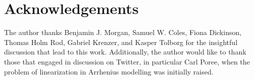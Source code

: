\documentclass[journal=jceda8,manuscript=article]{achemso}
\begin{document}
\section*{Acknowledgements}

The author thanks Benjamin J. Morgan, Samuel W. Coles, Fiona Dickinson, Thomas Holm Rod, Gabriel Krenzer, and Kasper Tolborg for the insightful discussion that lead to this work. 
Additionally, the author would like to thank those that engaged in discussion on Twitter, in particular Carl Poree, when the problem of linearization in Arrhenius modelling was initially raised. 


\end{document}
